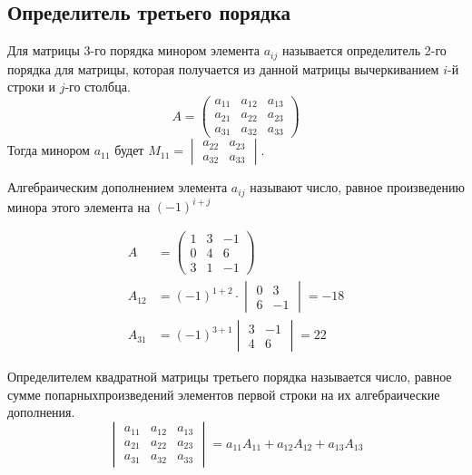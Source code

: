 \documentclass[12pt, a4paper]{article}
\begin{document}
    \subsection{Определитель третьего порядка}
    \begin{definition}
        Для матрицы 3-го порядка минором элемента \( a_{ij} \) называется определитель 2-го порядка для матрицы, которая получается из данной матрицы вычеркиванием \( i \)-й строки и \( j \)-го столбца.
        \[
            A = \begin{pmatrix} a_{11} & a_{12} & a_{13} \\ a_{21} & a_{22} & a_{23} \\ a_{31} & a_{32} & a_{33} \end{pmatrix} 
            \]Тогда минором \( a_{11} \)  будет \( M_{11} =  \begin{vmatrix} a_{22} & a_{23} \\ a_{32} & a_{33}\end{vmatrix}\).
    \end{definition}
    \begin{definition}
        Алгебраическим дополнением элемента \( a_{ij} \) называют число, равное произведению минора этого элемента на \( (-1)^{i+j} \)
    \end{definition}
    \begin{exmp}
        \begin{align*}
            A &= \begin{pmatrix} 1 & 3 & -1 \\ 0 &4 &6 \\ 3 & 1 & -1 \end{pmatrix}\\
            A_{12} &= (-1)^{1 + 2} \cdot \begin{vmatrix} 0 & 3 \\ 6 & -1\end{vmatrix} = -18 \\
            A_{31} &= (-1)^{3 + 1} \begin{vmatrix} 3 & -1 \\ 4 & 6\end{vmatrix} = 22
        \end{align*}
        
    \end{exmp}
    \begin{definition}
        Определителем квадратной матрицы третьего порядка называется число, равное сумме попарныхпроизведений элементов первой строки на их алгебраические дополнения.\[
            \begin{vmatrix}
                a_{11} & a_{12} & a_{13} \\ a_{21} & a_{22} & a_{23} \\ a_{31} & a_{32} & a_{33}
            \end{vmatrix} = a_{11}A_{11} + a_{12}A_{12} + a_{13}A_{13}
        \] 
    \end{definition}
\end{document}
